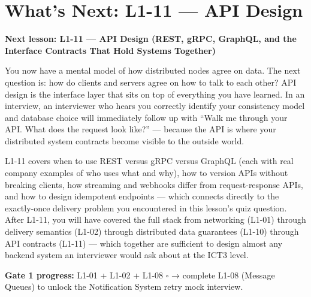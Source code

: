 \documentclass[11pt,a4paper]{article}
\begin{document}
\section{What's Next: L1-11 --- API Design}

\begin{insightbox}
\textbf{Next lesson: L1-11 --- API Design (REST, gRPC, GraphQL, and the Interface Contracts That Hold Systems Together)}

You now have a mental model of how distributed nodes agree on data. The next question is: how do clients and servers agree on how to talk to each other? API design is the interface layer that sits on top of everything you have learned. In an interview, an interviewer who hears you correctly identify your consistency model and database choice will immediately follow up with ``Walk me through your API. What does the request look like?'' --- because the API is where your distributed system contracts become visible to the outside world.

L1-11 covers when to use REST versus gRPC versus GraphQL (each with real company examples of who uses what and why), how to version APIs without breaking clients, how streaming and webhooks differ from request-response APIs, and how to design idempotent endpoints --- which connects directly to the exactly-once delivery problem you encountered in this lesson's quiz question. After L1-11, you will have covered the full stack from networking (L1-01) through delivery semantics (L1-02) through distributed data guarantees (L1-10) through API contracts (L1-11) --- which together are sufficient to design almost any backend system an interviewer would ask about at the ICT3 level.

\textbf{Gate 1 progress:} L1-01 \checkmark{} + L1-02 \checkmark{} + L1-08 $\square$ → complete L1-08 (Message Queues) to unlock the Notification System retry mock interview.
\end{insightbox}
\end{document}
